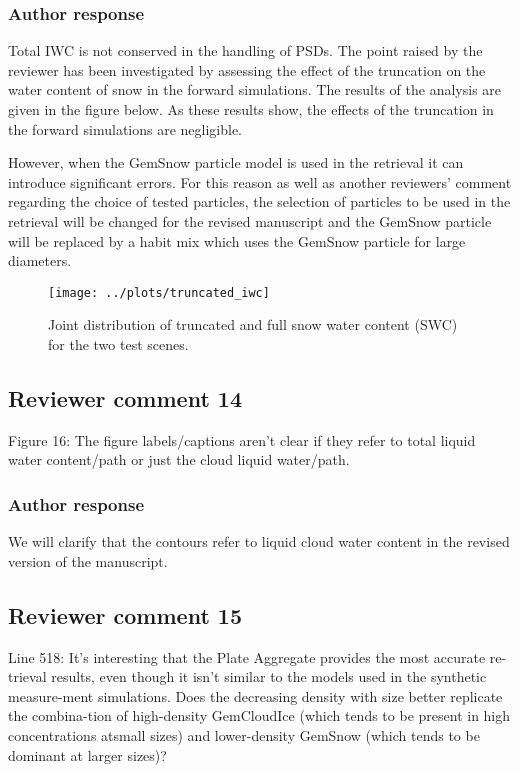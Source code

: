 \documentclass[11pt]{scrartcl}
\begin{document}
\begin{itemize}
\subsubsection*{Author response}

Total IWC is not conserved in the handling of PSDs. The point raised by the reviewer has been
investigated by assessing the effect of the truncation on the water content of snow in the
forward simulations. The results of the analysis are given in the figure below. As these results
show, the effects of the truncation in the forward simulations are negligible.

However, when the GemSnow particle model is used in the retrieval it can
introduce significant errors. For this reason as well as another reviewers'
comment regarding the choice of tested particles, the selection of particles to
be used in the retrieval will be changed for the revised manuscript and the
GemSnow particle will be replaced by a habit mix which uses the GemSnow
particle for large diameters.

\begin{figure}[!hbpt]
  \begin{center}
  \texttt{[image: ../plots/truncated\_iwc]}
  \caption{Joint distribution of truncated and full snow water content (SWC) for the
    two test scenes.}
  \end{center}
\end{figure}

\subsection*{Reviewer comment 14}

Figure 16: The figure labels/captions aren't clear if they refer to total liquid
water content/path or just the cloud liquid water/path.

\subsubsection{Author response}

We will clarify that the contours refer to liquid cloud water content in the
revised version of the manuscript.

\subsection*{Reviewer comment 15}

 Line 518: It’s interesting that the Plate Aggregate provides the most accurate
 re-trieval results, even though it isn’t similar to the models used in the
 synthetic measure-ment simulations. Does the decreasing density with size
 better replicate the combina-tion of high-density GemCloudIce (which tends to
 be present in high concentrations atsmall sizes) and lower-density GemSnow
 (which tends to be dominant at larger sizes)?


\end{itemize}
\end{document}
